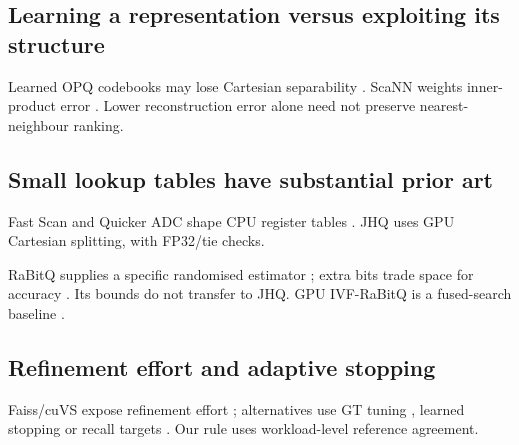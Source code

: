 \subsection{Learning a representation versus exploiting its structure}

Learned OPQ codebooks may lose Cartesian separability \cite{opq}. ScaNN weights inner-product error \cite{scann}. Lower reconstruction error alone need not preserve nearest-neighbour ranking.

\subsection{Small lookup tables have substantial prior art}

Fast Scan and Quicker ADC shape CPU register tables \cite{fastscan,quickeradc}. JHQ uses GPU Cartesian splitting, with FP32/tie checks.

RaBitQ supplies a specific randomised estimator \cite{rabitq}; extra bits trade space for accuracy \cite{rabitq_multi}. Its bounds do not transfer to JHQ. GPU IVF-RaBitQ is a fused-search baseline \cite{ivfrabitq}.

\subsection{Refinement effort and adaptive stopping}

Faiss/cuVS expose refinement effort \cite{faiss_refine,cuvs_refinement}; alternatives use GT tuning \cite{faiss_autotune}, learned stopping \cite{li_termination} or recall targets \cite{darth}. Our rule uses workload-level reference agreement.